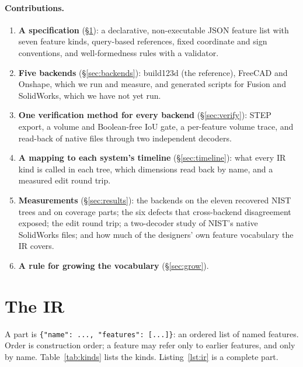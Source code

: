\documentclass[11pt]{article}
\newcommand{\code}[1]{\texttt{\small #1}}
\begin{document}
\paragraph{Contributions.}
\begin{enumerate}
\item \textbf{A specification} (\S\ref{sec:ir}): a declarative, non-executable
  JSON feature list with seven feature kinds, query-based references, fixed
  coordinate and sign conventions, and well-formedness rules with a validator.
\item \textbf{Five backends} (\S\ref{sec:backends}): build123d (the reference),
  FreeCAD and Onshape, which we run and measure, and generated scripts for
  Fusion and SolidWorks, which we have not yet run.
\item \textbf{One verification method for every backend}
  (\S\ref{sec:verify}): STEP export, a volume and Boolean-free IoU gate, a
  per-feature volume trace, and read-back of native files through two
  independent decoders.
\item \textbf{A mapping to each system's timeline} (\S\ref{sec:timeline}): what
  every IR kind is called in each tree, which dimensions read back by name, and
  a measured edit round trip.
\item \textbf{Measurements} (\S\ref{sec:results}): the backends on the eleven
  recovered NIST trees and on coverage parts; the six defects that cross-backend
  disagreement exposed; the edit round trip; a two-decoder study of NIST's
  native SolidWorks files; and how much of the designers' own feature vocabulary
  the IR covers.
\item \textbf{A rule for growing the vocabulary} (\S\ref{sec:grow}).
\end{enumerate}

\section{The IR}\label{sec:ir}

A part is \code{\{"name": ..., "features": [...]\}}: an ordered list of named
features. Order is construction order; a feature may refer only to earlier
features, and only by name. Table~\ref{tab:kinds} lists the kinds.
Listing~\ref{lst:ir} is a complete part.
\end{document}
